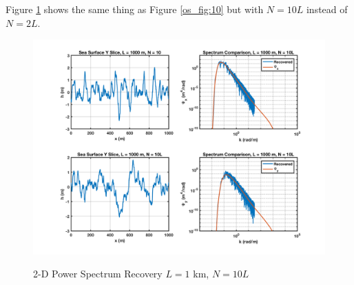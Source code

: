 Figure \ref{os_fig:10a} shows the same thing as Figure \ref{os_fig:10} but with $N=10L$ instead of $N = 2L$.
\begin{figure}[H]
  \begin{center}
\includegraphics[width=6in]{../media/Ocean_Surface/sea_surface_2d_slices_1000_10.png}
  \end{center}
  \renewcommand{\baselinestretch}{1} \small\normalsize
  \begin{quote}
    \caption[2-D Power Spectrum Recovery $L = 1$ km, $N = 10L$]{2-D Power Spectrum Recovery $L = 1$ km, $N = 10L$\label{os_fig:10a}}
  \end{quote}
\end{figure}
\renewcommand{\baselinestretch}{2} \small\normalsize

